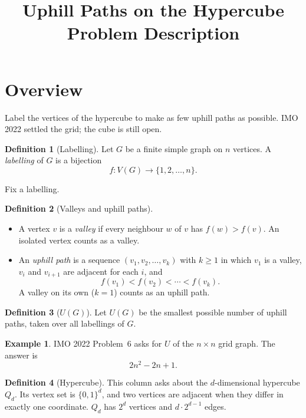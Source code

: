 \documentclass[11pt]{article}
\title{Uphill Paths on the Hypercube\\[0.4em]\large Problem Description}
\author{}
\date{}
\theoremstyle{definition}
\newtheorem*{definition}{Definition}
\newtheorem*{example}{Example}
\begin{document}
\maketitle

\section*{Overview}

Label the vertices of the hypercube to make as few uphill paths as
possible. IMO 2022 settled the grid; the cube is still open.

\begin{definition}[Labelling]
Let $G$ be a finite simple graph on $n$ vertices. A \emph{labelling}
of $G$ is a bijection
\[
  f \colon V(G) \to \{1, 2, \ldots, n\}.
\]
\end{definition}

Fix a labelling.

\begin{definition}[Valleys and uphill paths]
\leavevmode
\begin{itemize}[leftmargin=*]
  \item A vertex $v$ is a \emph{valley} if every neighbour $w$ of $v$
    has $f(w) > f(v)$. An isolated vertex counts as a valley.
  \item An \emph{uphill path} is a sequence $(v_1, v_2, \ldots, v_k)$
    with $k \geq 1$ in which $v_1$ is a valley, $v_i$ and $v_{i+1}$
    are adjacent for each $i$, and
    \[
      f(v_1) < f(v_2) < \cdots < f(v_k).
    \]
    A valley on its own ($k = 1$) counts as an uphill path.
\end{itemize}
\end{definition}

\begin{definition}[$U(G)$]
Let $U(G)$ be the smallest possible number of uphill paths, taken
over all labellings of $G$.
\end{definition}

\begin{example}
IMO 2022 Problem~6 asks for $U$ of the $n \times n$ grid graph. The
answer is
\[
  2n^2 - 2n + 1.
\]
\end{example}

\begin{definition}[Hypercube]
This column asks about the $d$-dimensional hypercube $Q_d$. Its
vertex set is $\{0, 1\}^d$, and two vertices are adjacent when they
differ in exactly one coordinate. $Q_d$ has $2^d$ vertices and
$d \cdot 2^{d-1}$ edges.
\end{definition}
\end{document}
